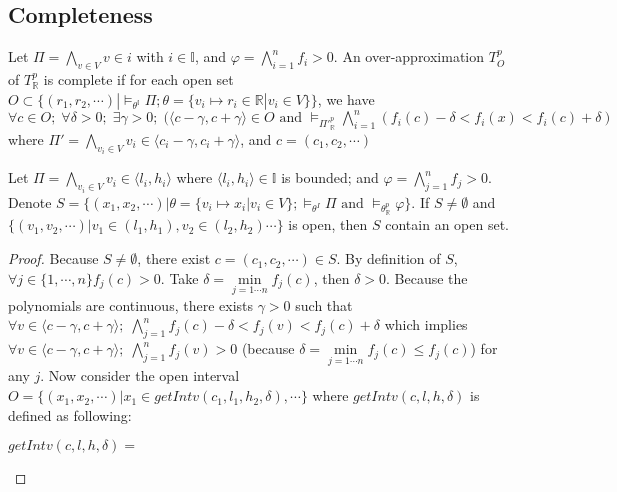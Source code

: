 \subsection{Completeness}
\begin{definition} \label{def:OT-complete}
\sloppy
Let $\Pi = \bigwedge\limits_{v \in V} v \in i$ with $i \in \mathbb{I}$, and ${\varphi = \bigwedge\limits_{i=1}^n f_i > 0}$. An over-approximation $T^p_O$ of $T^p_\mathbb{R}$ is complete if for each open set ${O \subset \{(r_1,r_2,\cdots) |  \models_{\theta^\mathbb{I}} \Pi; \theta = \{v_i \mapsto r_i \in \mathbb{R} | v_i  \in V\}\}}$, we have ${\forall c \in O; \; \forall \delta > 0; \; \exists \gamma > 0; \; (\langle c - \gamma, c + \gamma \rangle \in O \text{ and } \models_{\Pi'^p_\mathbb{R}} \bigwedge\limits_{i=1}^n(f_i(c)-\delta < f_i(x) < f_i(c) + \delta)}$ where ${\Pi' = \bigwedge\limits_{v_i \in V} v_i \in \langle c_i - \gamma, c_i + \gamma \rangle}$, and ${c = (c_1, c_2, \cdots)}$
\end{definition}

\begin{lemma} \label{lem:sat-complete}
Let $\Pi = \bigwedge\limits_{v_i \in V} v_i \in \langle l_i, h_i \rangle$ where $\langle l_i, h_i \rangle \in \mathbb{I}$ is bounded; and ${\varphi = \bigwedge\limits_{j = 1}^n f_j > 0}$. Denote $S = \{(x_1, x_2, \cdots) | \theta = \{v_i \mapsto x_i | v_i \in V \}; \models_{\theta^I} \Pi \text{ and } \models_{\theta^p_\mathbb{R}}\varphi \}$. If $S \neq \emptyset$ and $\{(v_1, v_2, \cdots) | v_1 \in (l_1, h_1), v_2 \in (l_2, h_2) \cdots \}$ is open, then $S$ contain an open set.
\end{lemma}

\begin{proof}
\sloppy
Because $S \neq \emptyset$, there exist $c = (c_1, c_2, \cdots) \in S$. By definition of $S$, ${\forall j \in \{1, \cdots, n\} f_j(c) > 0}$. Take $\delta = \min\limits_{j=1\cdots n} f_j(c)$, then $\delta > 0$. Because the polynomials are continuous, there exists $\gamma > 0$ such that $\forall v \in \langle c - \gamma, c + \gamma \rangle; \; \bigwedge\limits_{j=1}^n f_j(c) - \delta < f_j(v) < f_j(c) + \delta$ which implies ${\forall v \in \langle c - \gamma, c + \gamma \rangle; \; \bigwedge\limits_{j=1}^n f_j(v) > 0}$ (because $\delta = \min\limits_{j=1\cdots n}f_j(c) \le f_j(c)$) for any $j$.
Now consider the open interval $O = \{(x_1, x_2, \cdots) | x_1 \in getIntv(c_1, l_1, h_2, \delta), \cdots \}$ where $getIntv(c, l, h, \delta)$ is defined as following:
\begin{center}
$getIntv(c, l, h, \delta) = $
\end{center}
\end{proof}


